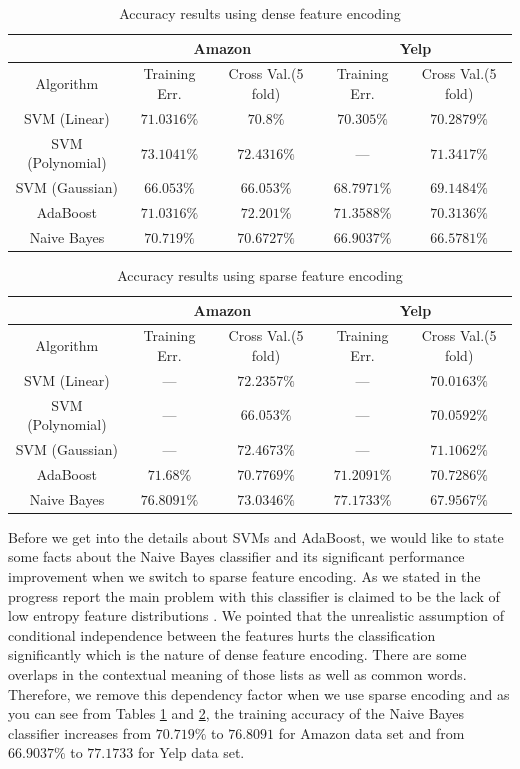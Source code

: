 \documentclass[letterpaper]{article}
\begin{document}
\begin{table}[ht]
\centering
\begin{tabular}{c | c c | c c}
 & \multicolumn{2}{|c|}{Amazon} & \multicolumn{2}{|c}{Yelp} \\
\hline
Algorithm & Training Err. & Cross Val.(5 fold) & Training Err. & Cross Val.(5 fold)\\
\hline
SVM (Linear) 		& $71.0316\%$ & $70.8\%$ & $70.305\%$ & $70.2879\%$\\
SVM (Polynomial) 	& $73.1041\%$ & $72.4316\%$ & --- & $71.3417\%$\\
SVM (Gaussian) 		& $66.053\%$ & $66.053\%$ & $68.7971\%$ & $69.1484\%$\\
AdaBoost 			& $71.0316\%$ & $72.201\%$ & $71.3588\%$ & $70.3136\%$\\ 
Naive Bayes 		& $70.719\%$ & $70.6727\%$ & $66.9037\%$ & $66.5781\%$\\ 
\end{tabular}
\caption{Accuracy results using dense feature encoding}
\label{tab:dense}
\end{table}


\begin{table}[ht]
\centering
\begin{tabular}{c | c c | c c}
 & \multicolumn{2}{|c|}{Amazon} & \multicolumn{2}{|c}{Yelp} \\
\hline
Algorithm & Training Err. & Cross Val.(5 fold) & Training Err. & Cross Val.(5 fold)\\
\hline
SVM (Linear) 		& --- & $72.2357\%$ 		& --- & $70.0163\%$\\
SVM (Polynomial) 	& --- & $66.053\%$ 		& --- & $70.0592\%$\\
SVM (Gaussian) 		& --- & $72.4673\%$ 		& --- & $71.1062\%$\\
AdaBoost 			& $71.68\%$   & $70.7769\%$ & $71.2091\%$ & $70.7286\%$\\ 
Naive Bayes 		& $76.8091\%$ & $73.0346\%$ & $77.1733\%$ & $67.9567\%$\\ 
\end{tabular}
\caption{Accuracy results using sparse feature encoding}
\label{tab:sparse}
\end{table}

Before we get into the details about SVMs and AdaBoost, we would like
to state some facts about the Naive Bayes classifier and its
significant performance improvement when we switch to sparse feature
encoding. As we stated in the progress report the main problem with
this classifier is claimed to be the lack of low entropy feature
distributions \cite{naivebayes}. We pointed that the unrealistic
assumption of conditional independence between the features hurts the
classification significantly which is the nature of dense feature
encoding. There are some overlaps in the contextual meaning of those
lists as well as common words. Therefore, we remove this dependency
factor when we use sparse encoding and as you can see from Tables
\ref{tab:dense} and \ref{tab:sparse}, the training accuracy of the
Naive Bayes classifier increases from $70.719\%$ to $76.8091$ for
Amazon data set and from $66.9037\%$ to $77.1733$ for Yelp data set.
\end{document}
